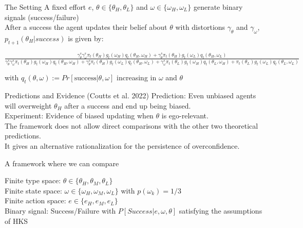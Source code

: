 \documentclass[aspectratio=169]{beamer}
\begin{document}
\begin{frame}{The Setting}
    A fixed effort $e$, $\theta \in \{\theta_H, \theta_L\}$ and $\omega \in \{\omega_H, \omega_L\}$ generate binary signals (success/failure)\\
    \bigskip
    After a success the agent updates their belief about $\theta$ with distortions $\gamma_\theta$ and $\gamma_\omega$, $p_{t+1}(\theta_H|success)$ is given by:\\
    \begin{center}
        \small
        $\frac{\gamma^s_\theta\gamma^s_\omega\pi_t(\theta_H) g_t(\omega_H) q_t(\theta_H, \omega_H) + \gamma^s_\theta\pi_t(\theta_H) g_t(\omega_L) q_t(\theta_H, \omega_L)}{\gamma^s_\theta\gamma^s_\omega\pi_t(\theta_H) g_t(\omega_H) q_t(\theta_H, \omega_H) + \gamma^s_\theta\pi_t(\theta_H) g_t(\omega_L) q_t(\theta_H, \omega_L) + \gamma^s_\omega\pi_t(\theta_L) g_t(\omega_H) q_t(\theta_L, \omega_H) + \pi_t(\theta_L) g_t(\omega_L) q_t(\theta_L, \omega_L)}$\\
    \end{center}
    \bigskip
    with $q_t(\theta, \omega):=Pr[\text{success}|\theta, \omega]$ increasing in $\omega$ and $\theta$
\end{frame}

\begin{frame}{Predictions and Evidence (Coutts et al. 2022)}
    Prediction: Even unbiased agents will overweight $\theta_H$ after a success and end up being biased.\\
    \bigskip
    Experiment: Evidence of biased updating when $\theta$ is ego-relevant.\\
    \bigskip
    The framework does not allow direct comparisons with the other two theoretical predictions.\\
    \bigskip
    It gives an alternative rationalization for the persistence of overconfidence.
    
    
\end{frame}

\begin{frame}{A framework where we can compare}

Finite type space: $\theta \in \{\theta_H, \theta_M, \theta_L\}$\\
\bigskip
Finite state space: $\omega \in \{\omega_H, \omega_M, \omega_L\}$
with $p(\omega_k)=1/3$ \\
\bigskip
Finite action space: $e \in \{e_H, e_M, e_L\}$\\
\bigskip
Binary signal: Success/Failure with $P\left[Success|e, \omega, \theta\right]$ satisfying the assumptions of HKS


\end{frame}
\end{document}
